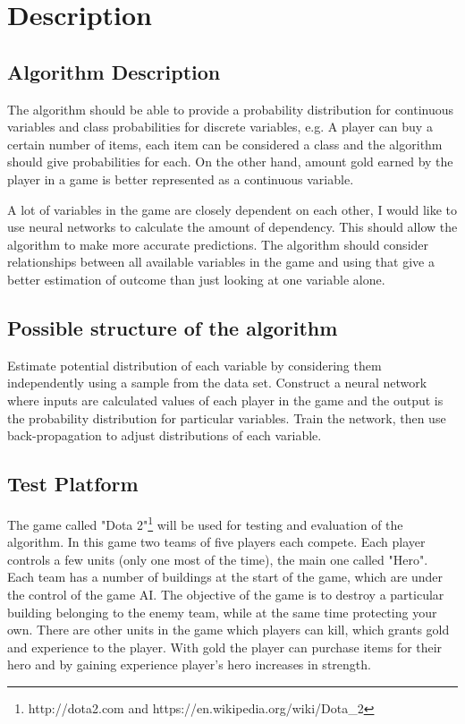 \documentclass[12pt,a4paper]{article}
\begin{document}
\section{Description}
\subsection{Algorithm Description}

The algorithm should be able to provide a probability distribution for continuous variables and class probabilities for discrete variables, e.g. A player can buy a certain number of items, each item can be considered a class and the algorithm should give probabilities for each. On the other hand, amount gold earned by the player in a game is better represented as a continuous variable.

A lot of variables in the game are closely dependent on each other, I would like to use neural networks to calculate the amount of dependency. This should allow the algorithm to make more accurate predictions. The algorithm should consider relationships between all available variables in the game and using that give a better estimation of outcome than just looking at one variable alone.

\subsection{Possible structure of the algorithm}
Estimate potential distribution of each variable by considering them independently using a sample from the data set. Construct a neural network where inputs are calculated values of each player in the game and the output is the probability distribution for particular variables. Train the network, then use back-propagation to adjust distributions of each variable.

\subsection{Test Platform}
The game called "Dota 2"\footnote{http://dota2.com and https://en.wikipedia.org/wiki/Dota\_2} will be used for testing and evaluation of the algorithm. In this game two teams of five players each compete. Each player controls a few units (only one most of the time), the main one called "Hero". Each team has a number of buildings at the start of the game, which are under the control of the game AI. The objective of the game is to destroy a particular building belonging to the enemy team, while at the same time protecting your own. There are other units in the game which players can kill, which grants gold and experience to the player. With gold the player can purchase items for their hero and by gaining experience player's hero increases in strength.
\end{document}
